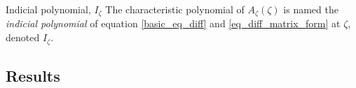 \documentclass[../main.tex]{subfiles}
\begin{document}
\begin{definition}{{Indicial polynomial, $I_\zeta$}}
	The characteristic polynomial of $A_\zeta(\zeta)$ is named the \emph{indicial polynomial} of equation \eqref{basic_eq_diff} and \eqref{eq_diff_matrix_form} at $\zeta$, denoted $I_\zeta$.
\end{definition}

%
%	
%	
%	
%	
%	
%	
%	

\subsection{Results}
\end{document}

